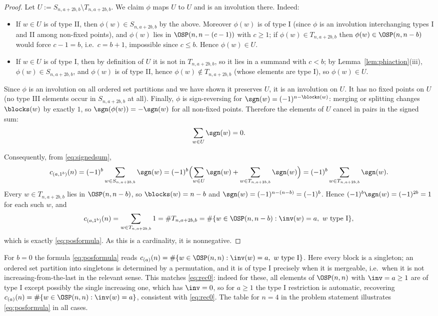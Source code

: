 \begin{proof}
Let $U:=S_{n,a+2b,b}\setminus T_{n,a+2b,b}$. We claim $\phi$ maps $U$ to $U$ and is an
involution there. Indeed:
\begin{itemize}
\item If $w\in U$ is of type II, then $\phi(w)\in S_{n,a+2b,b}$ by the above. Moreover
$\phi(w)$ is of type I (since $\phi$ is an involution interchanging types I and II among
non-fixed points), and $\phi(w)$ lies in $\OSP(n,n-(c-1))$ with $c\ge1$; if
$\phi(w)\in T_{n,a+2b,b}$ then $\phi(w)\in\OSP(n,n-b)$ would force $c-1=b$, i.e.\ $c=b+1$,
impossible since $c\le b$. Hence $\phi(w)\in U$.
\item If $w\in U$ is of type I, then by definition of $U$ it is not in $T_{n,a+2b,b}$, so it
lies in a summand with $c<b$; by Lemma~\ref{lem:phiaction}(iii), $\phi(w)\in S_{n,a+2b,b}$,
and $\phi(w)$ is of type II, hence $\phi(w)\notin T_{n,a+2b,b}$ (whose elements are type I),
so $\phi(w)\in U$.
\end{itemize}
Since $\phi$ is an involution on all ordered set partitions and we have shown it preserves
$U$, it is an involution on $U$. It has no fixed points on $U$ (no type III elements occur
in $S_{n,a+2b,b}$ at all). Finally, $\phi$ is sign-reversing for $\sgn(w)=(-1)^{n-\blocks(w)}$:
merging or splitting changes $\blocks(w)$ by exactly $1$, so $\sgn(\phi(w))=-\sgn(w)$ for
all non-fixed points. Therefore the elements of $U$ cancel in pairs in the signed sum:
\[
\sum_{w\in U}\sgn(w)=0 .
\]

Consequently, from \eqref{eq:signedsum},
\[
c_{(a,1^b)}(n)=(-1)^b\sum_{w\in S_{n,a+2b,b}}\sgn(w)
=(-1)^b\Bigl(\sum_{w\in U}\sgn(w)+\sum_{w\in T_{n,a+2b,b}}\sgn(w)\Bigr)
=(-1)^b\sum_{w\in T_{n,a+2b,b}}\sgn(w).
\]
Every $w\in T_{n,a+2b,b}$ lies in $\OSP(n,n-b)$, so $\blocks(w)=n-b$ and
$\sgn(w)=(-1)^{n-(n-b)}=(-1)^b$. Hence $(-1)^b\sgn(w)=(-1)^{2b}=1$ for each such $w$, and
\[
c_{(a,1^b)}(n)=\sum_{w\in T_{n,a+2b,b}}1=\#T_{n,a+2b,b}
=\#\{w\in\OSP(n,n-b):\inv(w)=a,\ w\ \text{type I}\},
\]
which is exactly \eqref{eq:posformula}. As this is a cardinality, it is nonnegative.
\end{proof}

\begin{remark}
For $b=0$ the formula \eqref{eq:posformula} reads
$c_{(a)}(n)=\#\{w\in\OSP(n,n):\inv(w)=a,\ w\ \text{type I}\}$. Here every block is a
singleton; an ordered set partition into singletons is determined by a permutation, and it
is of type I precisely when it is mergeable, i.e.\ when it is not increasing-from-the-last
in the relevant sense. This matches \eqref{eq:rec0}: indeed for these, all elements of
$\OSP(n,n)$ with $\inv=a\ge1$ are of type I except possibly the single increasing one, which
has $\inv=0$, so for $a\ge1$ the type I restriction is automatic, recovering
$c_{(a)}(n)=\#\{w\in\OSP(n,n):\inv(w)=a\}$, consistent with \eqref{eq:rec0}. The table for
$n=4$ in the problem statement illustrates \eqref{eq:posformula} in all cases.
\end{remark}

